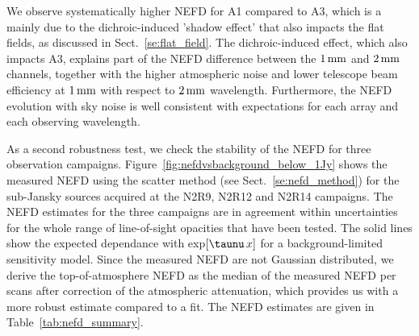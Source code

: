 We observe systematically higher NEFD for A1 compared to A3, which is a mainly
due to the dichroic-induced 'shadow effect' that also impacts the flat fields,
as discussed in Sect.~\ref{se:flat_field}.  The dichroic-induced effect, which
also impacts A3, explains part of the NEFD difference between the $1\, \rm{mm}$
and $2\, \rm{mm}$ channels, together with the higher atmospheric noise and lower
telescope beam efficiency at $1\, \rm{mm}$ with respect to $2\,\rm{mm}$
wavelength.  Furthermore, the NEFD evolution with sky noise is well
consistent with expectations for each array and each observing wavelength.

As a second robustness test, we check the stability of the NEFD for
three observation campaigns. Figure~\ref{fig:nefdvsbackground_below_1Jy} shows the
measured NEFD using the scatter method (see Sect.~\ref{se:nefd_method}) for the
sub-Jansky sources acquired at the N2R9, N2R12 and N2R14
campaigns. The NEFD estimates for the
three campaigns are in agreement within uncertainties for the whole
range of line-of-sight opacities that have been tested.
The solid lines show the expected dependance with
exp${[\taunu\,x]}$ for a background-limited sensitivity
model. Since the measured NEFD are not Gaussian distributed, we
derive the top-of-atmosphere NEFD as the median of the measured NEFD
per scans after correction of the atmospheric attenuation, which provides us
with a more robust estimate compared to a fit. The NEFD estimates
are given in Table~\ref{tab:nefd_summary}.

